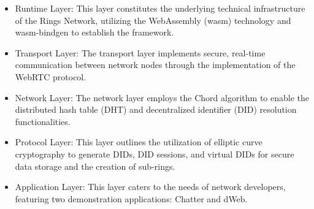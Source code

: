 \documentclass[twocolumn]{article}
\begin{document}
\begin{itemize}[itemsep=2pt,topsep=0pt,parsep=0pt]
\item Runtime Layer: This layer constitutes the underlying technical infrastructure of the Rings Network, utilizing the WebAssembly (wasm) technology and wasm-bindgen to establish the framework.
\item Transport Layer: The transport layer implements secure, real-time communication between network nodes through the implementation of the WebRTC protocol.
\item Network Layer: The network layer employs the Chord algorithm to enable the distributed hash table (DHT) and decentralized identifier (DID) resolution functionalities.
\item Protocol Layer: This layer outlines the utilization of elliptic curve cryptography to generate DIDs, DID sessions, and virtual DIDs for secure data storage and the creation of sub-rings.
\item Application Layer: This layer caters to the needs of network developers, featuring two demonstration applications: Chatter and dWeb.
\end{itemize}

\end{document}
